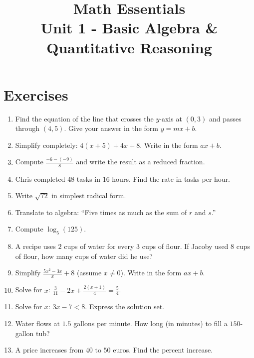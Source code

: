 \documentclass{article}
\title{Math Essentials \\ Unit 1 - Basic Algebra \& Quantitative Reasoning}
\author{}
\date{}
\begin{document}
\maketitle

\section*{Exercises}

\begin{enumerate}[label=\textbf{\arabic*.}, leftmargin=*, itemsep=0.6em]

\item Find the equation of the line that crosses the $y$-axis at $(0,3)$ and passes through $(4,5)$. Give your answer in the form $y=mx+b$.

\item Simplify completely: $4(x+5)+4x+8$. Write in the form $ax+b$.

\item Compute $\displaystyle \frac{-6-(-9)}{8}$ and write the result as a reduced fraction.

\item Chris completed $48$ tasks in $16$ hours. Find the rate in tasks per hour.

\item Write $\sqrt{72}$ in simplest radical form.

\item Translate to algebra: “Five times as much as the sum of $r$ and $s$.”

\item Compute $\log_{5}(125)$.

\item A recipe uses $2$ cups of water for every $3$ cups of flour. If Jacoby used $8$ cups of flour, how many cups of water did he use?

\item Simplify $\displaystyle \frac{5x^{2}-3x}{x}+8$ (assume $x\neq 0$). Write in the form $ax+b$.

\item Solve for $x$: \(\displaystyle \frac{3}{11}-2x+\frac{2(x+1)}{4}=\frac{5}{4}\).

\item Solve for $x$: \(3x-7<8\). Express the solution set.

\item Water flows at $1.5$ gallons per minute. How long (in minutes) to fill a $150$-gallon tub?

\item A price increases from \(40\) to \(50\) euros. Find the percent increase.

\end{enumerate}
\end{document}
